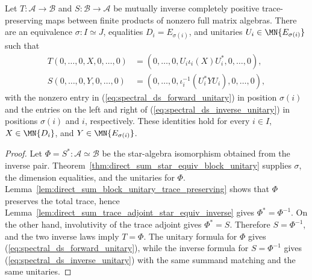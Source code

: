 \begin{theorem}
    \label{thm:direct_sum_inverse_cptp_forward_unitary}
    \leanok
    Let $T:\mathcal A\to\mathcal B$ and $S:\mathcal B\to\mathcal A$ be
    mutually inverse completely positive trace-preserving maps between finite
    products of nonzero full matrix algebras. There are an equivalence
    $\sigma:I\simeq J$, equalities $D_i=E_{\sigma(i)}$, and unitaries
    $U_i\in\MN{E_{\sigma(i)}}$ such that
    \begin{align}
        T(0,\ldots,0,X,0,\ldots,0)
         & =(0,\ldots,0,U_i\iota_i(X)U_i^*,0,\ldots,0),
        \label{eq:spectral_ds_forward_unitary}               \\
        S(0,\ldots,0,Y,0,\ldots,0)
         & =(0,\ldots,0,\iota_i^{-1}(U_i^*YU_i),0,\ldots,0),
        \label{eq:spectral_ds_inverse_unitary}
    \end{align}
    with the nonzero entry in
    (\ref{eq:spectral_ds_forward_unitary}) in position $\sigma(i)$ and the
    entries on the left and right of
    (\ref{eq:spectral_ds_inverse_unitary}) in positions $\sigma(i)$ and $i$,
    respectively. These identities hold for every $i\in I$,
    $X\in\MN{D_i}$, and $Y\in\MN{E_{\sigma(i)}}$.
\end{theorem}

\begin{proof}\leanok
    Let $\Phi=S^*:\mathcal A\simeq\mathcal B$ be the star-algebra
    isomorphism obtained from the inverse pair.
    Theorem~\ref{thm:direct_sum_star_equiv_block_unitary} supplies $\sigma$,
    the dimension equalities, and the unitaries for $\Phi$.
    Lemma~\ref{lem:direct_sum_block_unitary_trace_preserving} shows that
    $\Phi$ preserves the total trace, hence
    Lemma~\ref{lem:direct_sum_trace_adjoint_star_equiv_inverse} gives
    $\Phi^*=\Phi^{-1}$. On the other hand, involutivity of the trace adjoint
    gives $\Phi^*=S$. Therefore $S=\Phi^{-1}$, and the two inverse laws imply
    $T=\Phi$. The unitary formula for $\Phi$ gives
    (\ref{eq:spectral_ds_forward_unitary}), while the inverse formula for
    $S=\Phi^{-1}$ gives (\ref{eq:spectral_ds_inverse_unitary}) with the same
    summand matching and the same unitaries.
\end{proof}

